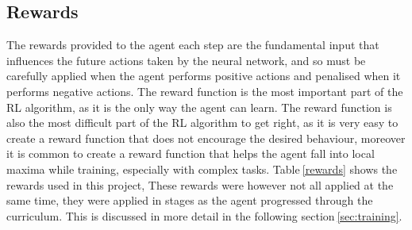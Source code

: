 \subsection{Rewards}

The rewards provided to the agent each step are the fundamental input that influences the future actions taken by the neural network, and so must be carefully applied when the agent performs positive actions and penalised when it performs negative actions. The reward function is the most important part of the RL algorithm, as it is the only way the agent can learn. The reward function is also the most difficult part of the RL algorithm to get right, as it is very easy to create a reward function that does not encourage the desired behaviour, moreover it is common to create a reward function that helps the agent fall into local maxima while training, especially with complex tasks. Table$~$\ref{rewards} shows the rewards used in this project, These rewards were however not all applied at the same time, they were applied in stages as the agent progressed through the curriculum. This is discussed in more detail in the following section$~$\ref{sec:training}.


